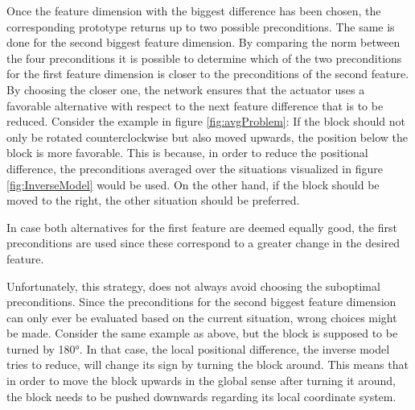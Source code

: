Once the feature dimension with the biggest difference has been chosen, the corresponding prototype returns up to two possible preconditions. The same is done for the second biggest feature dimension. By comparing the norm between the four preconditions it is possible to determine which of the two preconditions for the first feature dimension is closer to the preconditions of the second feature. By choosing the closer one, the network ensures that the actuator uses a favorable alternative with respect to the next feature difference that is to be reduced. Consider the example in figure \ref{fig:avgProblem}: If the block should not only be rotated counterclockwise but also moved upwards, the position below the block is more favorable. This is because, in order to reduce the positional difference, the preconditions averaged over the situations visualized in figure \ref{fig:InverseModel} would be used. On the other hand, if the block should be moved to the right, the other situation should be preferred. %

In case both alternatives for the first feature are deemed equally good, the first preconditions are used since these correspond to a greater change in the desired feature.

Unfortunately, this strategy, does not always avoid choosing the suboptimal preconditions. Since the preconditions for the second biggest feature dimension can only ever be evaluated based on the current situation, wrong choices might be made. Consider the same example as above, but the block is supposed to be turned by 180°. In that case, the local positional difference, the inverse model tries to reduce, will change its sign by turning the block around. This means that in order to move the block upwards in the global sense after turning it around, the block needs to be pushed downwards regarding its local coordinate system. %


